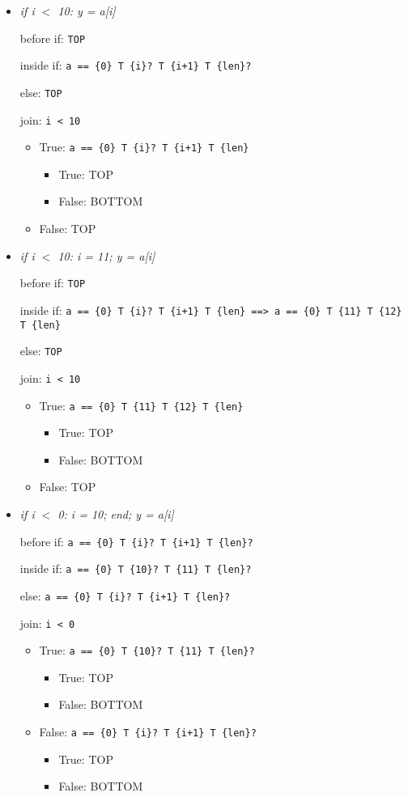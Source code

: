 \documentclass[11pt]{article}
\begin{document}
\begin{itemize}
\item \textit{if i $<$ 10: y = a[i]}

before if: \verb|TOP|

inside if: \verb|a == {0} T {i}? T {i+1} T {len}?|

else: \verb|TOP|

join: \verb|i < 10|
\begin{itemize}
\item True: \verb|a == {0} T {i}? T {i+1} T {len}|
\begin{itemize}
\item True: TOP
\item False: BOTTOM
\end{itemize}
\item False: TOP
\end{itemize}


\item \textit{if i $<$ 10: i = 11; y = a[i]}

before if: \verb|TOP|

inside if: \verb|a == {0} T {i}? T {i+1} T {len} ==> a == {0} T {11} T {12} T {len}|

else: \verb|TOP|

join: \verb|i < 10|
\begin{itemize}
\item True: \verb|a == {0} T {11} T {12} T {len}|
\begin{itemize}
\item True: TOP
\item False: BOTTOM
\end{itemize}
\item False: TOP
\end{itemize}


\item \textit{if i $<$ 0: i = 10; end; y = a[i]}

before if: \verb|a == {0} T {i}? T {i+1} T {len}?|

inside if: \verb|a == {0} T {10}? T {11} T {len}?|

else: \verb|a == {0} T {i}? T {i+1} T {len}?|

join: \verb|i < 0|
\begin{itemize}
\item True: \verb|a == {0} T {10}? T {11} T {len}?|
\begin{itemize}
\item True: TOP
\item False: BOTTOM
\end{itemize}
\item False: \verb|a == {0} T {i}? T {i+1} T {len}?|
\begin{itemize}
\item True: TOP
\item False: BOTTOM
\end{itemize}
\end{itemize}



\end{itemize}
\end{document}
